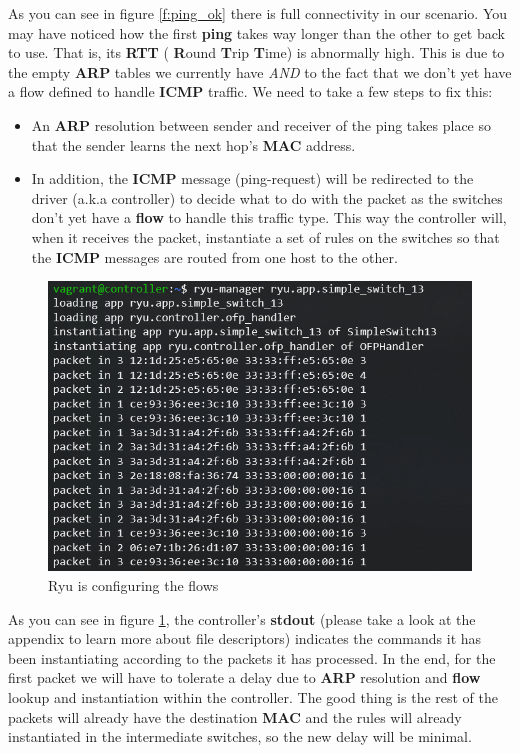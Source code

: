 \documentclass[12pt]{article}
\begin{document}
		As you can see in figure \ref{f:ping_ok} there is full connectivity in our scenario. You may have noticed how the first  \textbf{ping} takes way longer than the other to get back to use. That is, its  \textbf{RTT} ( \textbf{R}ound  \textbf{T}rip  \textbf{T}ime) is abnormally high. This is due to the empty  \textbf{ARP} tables we currently have \textit{AND} to the fact that we don't yet have a flow defined to handle  \textbf{ICMP} traffic. We need to take a few steps to fix this:

		\begin{itemize}
			\item An \textbf{ARP} resolution between sender and receiver of the ping takes place so that the sender learns the next hop's \textbf{MAC} address.
			\item In addition, the \textbf{ICMP} message (ping-request) will be redirected to the driver (a.k.a controller) to decide what to do with the packet as the switches don't yet have a \textbf{flow} to handle this traffic type. This way the controller will, when it receives the packet, instantiate a set of rules on the switches so that the \textbf{ICMP} messages are routed from one host to the other.
		\end{itemize}
        \newpage
		\begin{figure}
			\centering
			\includegraphics[width=\linewidth]{ryu_rcv.png}
			\caption{Ryu is configuring the flows}
			\label{f:ryu_rcv}
		\end{figure}

		As you can see in figure \ref{f:ryu_rcv}, the controller's \textbf{stdout} (please take a look at the appendix to learn more about file descriptors) indicates the commands it has been instantiating according to the packets it has processed. In the end, for the first packet we will have to tolerate a delay due to \textbf{ARP} resolution and \textbf{flow} lookup and instantiation within the controller. The good thing is the rest of the packets will already have the destination \textbf{MAC} and the rules will already instantiated in the intermediate switches, so the new delay will be minimal.
\end{document}
